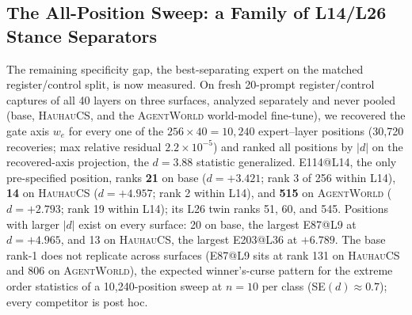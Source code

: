 \documentclass[10pt,a4paper,twocolumn]{article}
\begin{document}
\subsection{The All-Position Sweep: a Family of L14/L26 Stance Separators}\label{sec:family}

The remaining specificity gap, the best-separating expert on the matched
register/control split, is now measured. On fresh 20-prompt register/control
captures of all 40 layers on three surfaces, analyzed separately and never
pooled (base, \textsc{HauhauCS}, and the \textsc{AgentWorld} world-model
fine-tune), we recovered the gate axis $w_e$ for every one of the
$256{\times}40{=}10{,}240$ expert--layer positions (30{,}720 recoveries; max
relative residual $2.2\times10^{-5}$) and ranked all positions by $|d|$ on the
recovered-axis projection, the $d{=}3.88$ statistic generalized. E114@L14, the
only pre-specified position, ranks \textbf{21} on base ($d{=}{+}3.421$; rank 3
of 256 within L14), \textbf{14} on \textsc{HauhauCS} ($d{=}{+}4.957$; rank 2
within L14), and \textbf{515} on \textsc{AgentWorld} ($d{=}{+}2.793$; rank 19
within L14); its L26 twin ranks 51, 60, and 545. Positions with larger $|d|$
exist on every surface: 20 on base, the largest E87@L9 at $d{=}{+}4.965$, and
13 on \textsc{HauhauCS}, the largest E203@L36 at $+6.789$. The base rank-1
does not replicate across surfaces (E87@L9 sits at rank 131 on
\textsc{HauhauCS} and 806 on \textsc{AgentWorld}), the expected winner's-curse
pattern for the extreme order statistics of a 10{,}240-position sweep at
$n{=}10$ per class (SE$(d){\approx}0.7$); every competitor is post hoc.
\end{document}
